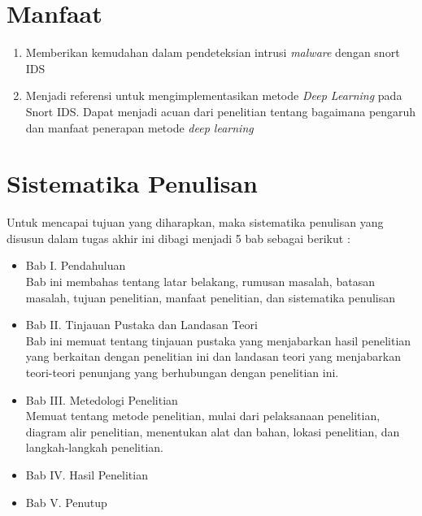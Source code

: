 \documentclass[skripsi.tex]{subfiles}
\begin{document}
\section{Manfaat}
\begin{enumerate}
    \item Memberikan kemudahan dalam pendeteksian intrusi \textit{malware} dengan snort IDS
    \item Menjadi referensi untuk mengimplementasikan metode \textit{Deep Learning} pada Snort IDS. Dapat menjadi acuan dari penelitian tentang bagaimana pengaruh dan manfaat penerapan metode \textit{deep learning}
\end{enumerate}
\section{Sistematika Penulisan}
Untuk mencapai tujuan yang diharapkan, maka sistematika penulisan yang disusun dalam tugas akhir ini dibagi menjadi 5 bab sebagai berikut :
\begin{itemize}
    \item Bab I. Pendahuluan \\ Bab ini membahas tentang latar belakang, rumusan masalah, batasan masalah, tujuan penelitian, manfaat penelitian, dan sistematika penulisan
    \item Bab II. Tinjauan Pustaka dan Landasan Teori \\ Bab ini memuat tentang tinjauan pustaka yang menjabarkan hasil penelitian yang berkaitan dengan penelitian ini dan landasan teori yang menjabarkan teori-teori penunjang yang berhubungan dengan penelitian ini.
    \item Bab III. Metedologi Penelitian \\ Memuat tentang metode penelitian, mulai dari pelaksanaan penelitian, diagram alir penelitian, menentukan alat dan bahan, lokasi penelitian, dan langkah-langkah penelitian.
    \item Bab IV. Hasil Penelitian
    \item Bab V. Penutup
\end{itemize}
\end{document}
